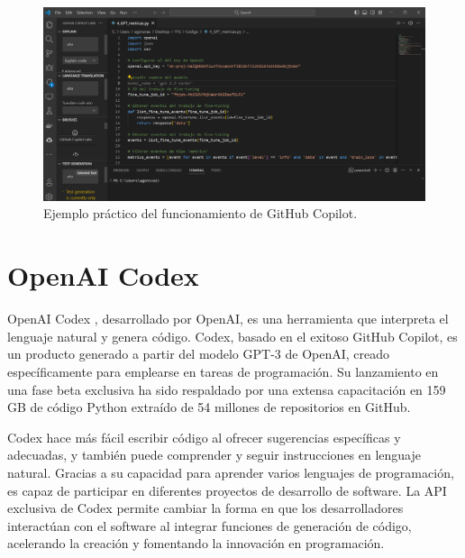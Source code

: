 \begin{figure}[htbp!]
  \centering
  \includegraphics[width=1\textwidth]{imaxes/1_MuestraCopilot.png}
\caption{Ejemplo práctico del funcionamiento de GitHub Copilot.}
  \label{fig:1_MuestraCopilot}
\end{figure}


\section{OpenAI Codex}

OpenAI Codex \cite{OpenAICodex}, desarrollado por OpenAI, es una herramienta que interpreta el lenguaje natural y genera código. Codex, basado en el exitoso GitHub Copilot, es un producto generado a partir del modelo \acrshort{GPT}-3 de OpenAI, creado específicamente para emplearse en tareas de programación. Su lanzamiento en una fase beta exclusiva ha sido respaldado por una extensa capacitación en 159 GB de código Python extraído de 54 millones de repositorios en GitHub.

Codex hace más fácil escribir código al ofrecer sugerencias específicas y adecuadas, y también puede comprender y seguir instrucciones en lenguaje natural. Gracias a su capacidad para aprender varios lenguajes de programación, es capaz de participar en diferentes proyectos de desarrollo de software. La \acrshort{API} exclusiva de Codex permite cambiar la forma en que los desarrolladores interactúan con el software al integrar funciones de generación de código, acelerando la creación y fomentando la innovación en programación.